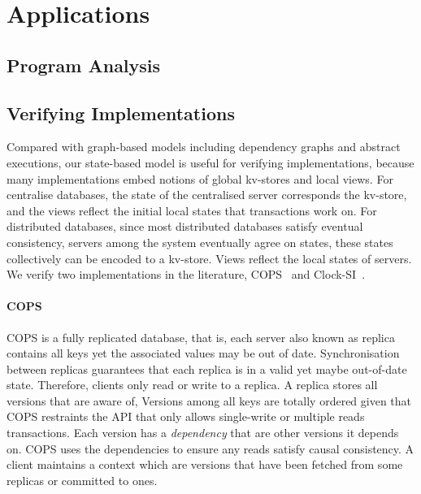 \section{Applications}
\label{sec:applications}

\subsection{Program Analysis}
\label{sec:program-analysis}

\subsection{Verifying Implementations}
\label{sec:verify-impl}
Compared with graph-based models including dependency graphs and abstract executions,
our state-based model is useful for verifying implementations,
because many implementations embed notions of global kv-stores and local views.
For centralise databases, the state of the centralised server corresponds the kv-store,
and the views reflect the initial local states that transactions work on.
For distributed databases, since most distributed databases satisfy eventual consistency, 
\ie servers among the system eventually agree on states,
these states collectively can be encoded to a kv-store.
Views reflect the local states of servers.
We verify two implementations in the literature, 
COPS~\cite{Lloyd:2011:DSE:2043556.2043593} and Clock-SI~\cite{Du:2013:CSI:2553409.2553434}.

\paragraph{\bf COPS}
COPS is a fully replicated database, that is, 
each server also known as replica contains all keys yet the associated values may be out of date.
Synchronisation between replicas guarantees that each replica is in a valid yet maybe out-of-date state.
Therefore, clients only read or write to a replica.
A replica stores all versions that are aware of,
Versions among all keys are totally ordered given that
COPS restraints the API that only allows single-write or multiple reads transactions.
Each version has a \emph{dependency} that are other versions it depends on.
COPS uses the dependencies to ensure any reads satisfy causal consistency.
A client maintains a context which are versions 
that have been fetched from some replicas or committed to ones.

